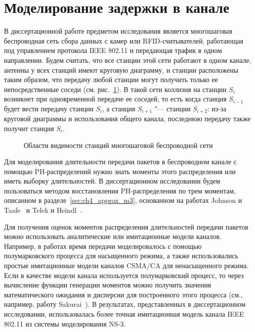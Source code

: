 \section{Моделирование задержки в канале}\label{sec:ch4_channel}

В диссертационной работе предметом исследования является многошаговая беспроводная сеть сбора данных с камер или RFID-считывателей, работающая под управлением протокола IEEE 802.11 и передающая трафик в одном направлении. Будем считать, что все станции этой сети работают в одном канале, антенны у всех станций имеют круговую диаграмму, и станции расположены таким образом, что передачу любой станции могут получить только ее непосредственные соседи (см. рис.~\ref{fig:ch4_network_collisions}). В такой сети коллизия на станции $S_i$ возникнет при одновременной передаче ее соседей, то есть когда станция $S_{i-1}$ будет вести передачу станции $S_i$, а станция $S_{i+1}$ "--- станции $S_{i+2}$: из-за круговой диаграммы и использования общего канала, последнюю передачу также получит станция $S_i$.

\begin{figure}[h]
  \caption{Области видимости станций многошаговой беспроводной сети}
  \label{fig:ch4_network_collisions}
\end{figure}

Для моделирования длительности передачи пакетов в беспроводном канале с помощью PH-распределений нужно знать моменты этого распределения или иметь выборку длительностей. В диссертационном исследовании будем пользоваться методом восстановления PH-распределения по трем моментам, описанном в разделе~\ref{sec:ch4_approx_m3}, основанном на работах Johnson и Taafe~\cite{Johnson1989} и Telek и Heindl~\cite{Telek2003}.

Для получения оценок моментов распределения длительностей передачи пакетов можно использовать аналитические или имитационные модели каналов. Например, в работах \cite{QS_ICAAPSP2020,QS_ITMM2019} время передачи моделировалось с помощью полумарковского процесса для насыщенного режима, а также использовались простые имитационные модели каналов CSMA/CA для ненасыщенного режима. Если в качестве модели канала используется полумарковский процесс, то через вычисление функции генерации моментов можно получить значения математического ожидания и дисперсии для построенного этого процесса (см., например, работу Sakurai~\cite{Sakurai2007}). В результатах, представленных в диссертационном исследовании, использовалась более точная имитационная модель канала IEEE 802.11 из системы моделирования NS-3.

